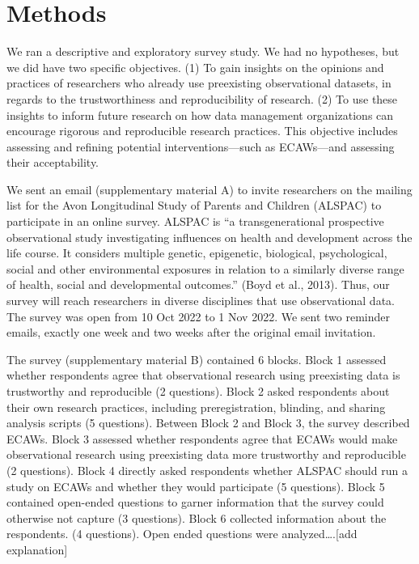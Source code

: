 \documentclass[
  man]{apa6}
\begin{document}
\hypertarget{methods}{%
\section{Methods}\label{methods}}

We ran a descriptive and exploratory survey study. We had no hypotheses, but we did have two specific objectives. (1) To gain insights on the opinions and practices of researchers who already use preexisting observational datasets, in regards to the trustworthiness and reproducibility of research. (2) To use these insights to inform future research on how data management organizations can encourage rigorous and reproducible research practices. This objective includes assessing and refining potential interventions---such as ECAWs---and assessing their acceptability.

We sent an email (supplementary material A) to invite researchers on the mailing list for the Avon Longitudinal Study of Parents and Children (ALSPAC) to participate in an online survey. ALSPAC is ``a transgenerational prospective observational study investigating influences on health and development across the life course. It considers multiple genetic, epigenetic, biological, psychological, social and other environmental exposures in relation to a similarly diverse range of health, social and developmental outcomes.'' (Boyd et al., 2013). Thus, our survey will reach researchers in diverse disciplines that use observational data. The survey was open from 10 Oct 2022 to 1 Nov 2022. We sent two reminder emails, exactly one week and two weeks after the original email invitation.

The survey (supplementary material B) contained 6 blocks. Block 1 assessed whether respondents agree that observational research using preexisting data is trustworthy and reproducible (2 questions). Block 2 asked respondents about their own research practices, including preregistration, blinding, and sharing analysis scripts (5 questions). Between Block 2 and Block 3, the survey described ECAWs. Block 3 assessed whether respondents agree that ECAWs would make observational research using preexisting data more trustworthy and reproducible (2 questions). Block 4 directly asked respondents whether ALSPAC should run a study on ECAWs and whether they would participate (5 questions). Block 5 contained open-ended questions to garner information that the survey could otherwise not capture (3 questions). Block 6 collected information about the respondents. (4 questions). Open ended questions were analyzed\ldots.{[}add explanation{]}
\end{document}
